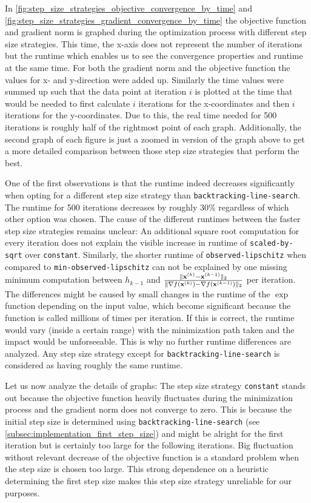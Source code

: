In \cref{fig:step_size_strategies_objective_convergence_by_time} and \cref{fig:step_size_strategies_gradient_convergence_by_time}
the objective function and gradient norm is graphed during the optimization process with different step size strategies.
This time, the x-axis does not represent the number of iterations but the runtime
which enables us to see the convergence properties and runtime at the same time.
For both the gradient norm and the objective function the values for x- and y-direction were added up.
Similarly the time values were summed up such that the data point at iteration \(i\) is plotted
at the time that would be needed to first calculate \(i\) iterations for the x-coordinates and then \(i\) iterations for the y-coordinates.
Due to this, the real time needed for 500 iterations is roughly half of the rightmost point of each graph.
Additionally, the second graph of each figure is just a zoomed in version of the graph above to get a more detailed comparison
between those step size strategies that perform the best.

One of the first observations is that the runtime indeed decreases significantly
when opting for a different step size strategy than \texttt{backtracking-line-search}.
The runtime for 500 iterations decreases by roughly 30\% regardless of which other option was chosen.
The cause of the different runtimes between the faster step size strategies remains unclear:
An additional square root computation for every iteration does not explain the visible increase in runtime
of \texttt{scaled-by-sqrt} over \texttt{constant}.
Similarly, the shorter runtime of \texttt{observed-lipschitz} when compared to \texttt{min-observed-lipschitz}
can not be explained by one missing minimum computation between
\(h_{k-1}\) and \(\frac{\lVert \mathbf{x}^{(k)} - \mathbf{x}^{(k-1)} \rVert_2}{\lVert \nabla f(\mathbf{x}^{(k)}) - \nabla f(\mathbf{x}^{(k-1)}) \rVert_2}\)
per iteration.
The differences might be caused by small changes in the runtime of the \(\exp\) function depending on the input value,
which become significant because the function is called millions of times per iteration.
If this is correct, the runtime would vary (inside a certain range) with the minimization path taken
and the impact would be unforseeable.
This is why no further runtime differences are analyzed.
Any step size strategy except for \texttt{backtracking-line-search} is considered as having roughly the same runtime.

Let us now analyze the details of graphs:
The step size strategy \texttt{constant} stands out because the objective function heavily fluctuates
during the minimization process and the gradient norm does not converge to zero.
This is because the initial step size is determined using \texttt{backtracking-line-search} (see \cref{subsec:implementation_first_step_size})
and might be alright for the first iteration but is certainly too large for the following iterations.
Big fluctuation without relevant decrease of the objective function is a standard problem
when the step size is chosen too large.
This strong dependence on a heuristic determining the first step size makes this step size strategy unreliable for our purposes.

